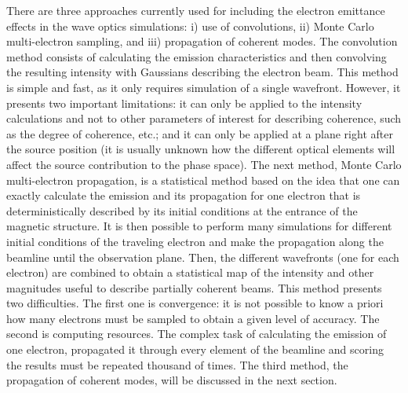 \documentclass{iucr}              %
\newcommand{\inred}[1]{{\color{black}#1}}
\begin{document}
There are three approaches currently used for including the electron emittance effects in the wave optics simulations: i) use of convolutions, ii) Monte Carlo multi-electron sampling, and iii) \inred{p}ropagation of coherent modes. The convolution method consists of calculating the emission characteristics and then convolving the resulting intensity with Gaussians describing the electron beam. This method is simple and fast, as \inred{it} only requires simulation of a single wavefront. However, it presents two important limitations: it can only be applied to the intensity calculations and not to other parameters of interest for describing coherence, such as the degree of coherence, etc.; and it can only be applied at a plane right after the source position (it is usually unknown how the different optical elements will affect the source contribution to the phase space). The next method, Monte Carlo multi-electron propagation, is a statistical method based on the idea that one can exactly calculate the emission and its propagation for one electron that is deterministically described by its initial conditions at the entrance of the magnetic structure. It is then possible to perform many simulations for different initial conditions of the traveling electron and make the propagation along the beamline until the observation plane. Then, the different wavefronts (one for each electron) are combined to obtain a statistical map of the intensity and other magnitudes useful to describe partially coherent beams. This method presents two difficulties. The first one is convergence: it is not possible to know a priori how many electrons must be sampled to obtain a given level of accuracy. The second is computing resources. The complex task of calculating the emission of one electron, propagated it through every element of the beamline \inred{and scoring the results} must be repeated thousand of times. The third method, the propagation of coherent modes, will be discussed in the next section. 
\end{document}

